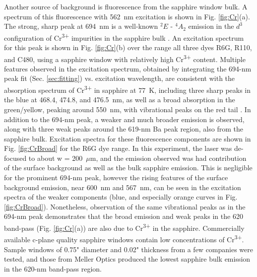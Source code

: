 Another source of background is fluorescence from the sapphire window bulk.  A spectrum of this fluorescence with 562~nm excitation is shown in Fig. \ref{fig:Cr}(a).  The strong, sharp peak at 694~nm is a well-known $^{2}E$ - $^{4}A_{2}$ emission in the $d^{3}$ configuration of Cr\textsuperscript{3+} impurities in the sapphire bulk \cite{SapphireRlines1964,SapphireRlines2010}.  An excitation spectrum for this peak is shown in Fig. \ref{fig:Cr}(b) over the range all three dyes R6G, R110, and C480, using a sapphire window with relatively high Cr\textsuperscript{3+} content.  Multiple features observed in the excitation spectrum, obtained by integrating the 694-nm peak fit (Sec. \ref{sec:fitting}) vs. excitation wavelength, are consistent with the absorption spectrum of Cr\textsuperscript{3+} in sapphire at 77~K, including three sharp peaks in the blue at 468.4, 474.8, and 476.5~nm, as well as a broad absorption in the green/yellow, peaking around 550~nm, with vibrational peaks on the red tail \cite{SapphireFord,SapphireMcclure}.  In addition to the 694-nm peak, a weaker and much broader emission is observed, along with three weak peaks around the 619-nm Ba peak region, also from the sapphire bulk.  Excitation spectra for these fluorescence components are shown in Fig. \ref{fig:CrBroad} for the R6G dye range.  In this experiment, the laser was de-focused to about w = 200~$\mu$m, and the emission observed was had contribution of the surface background as well as the bulk sapphire emission.  This is negligible for the prominent 694-nm peak, however the rising features of the surface background emission, near 600~nm and 567~nm, can be seen in the excitation spectra of the weaker components (blue, and especially orange curves in Fig. \ref{fig:CrBroad}).  Nonetheless, observation of the same vibrational peaks as in the 694-nm peak demonstrates that the broad emission and weak peaks in the 620 band-pass (Fig. \ref{fig:Cr}(a)) are also due to Cr\textsuperscript{3+} in the sapphire.  Commercially available c-plane quality sapphire windows contain low concentrations of Cr\textsuperscript{3+}.  Sample windows of 0.75" diameter and 0.02" thickness from a few companies were tested, and those from Meller Optics produced the lowest sapphire bulk emission in the 620-nm band-pass region.

